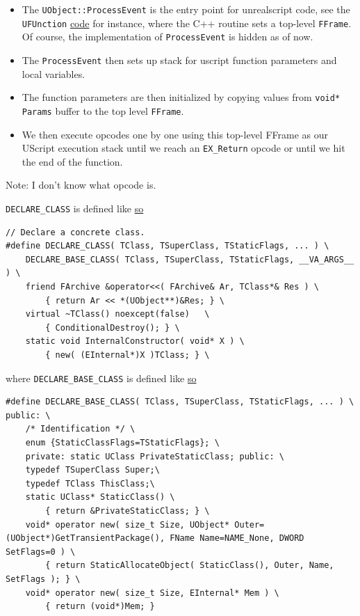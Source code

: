\documentclass{article}
\theoremstyle{definition}
\begin{document}
\begin{itemize}
\item The \texttt{UObject::ProcessEvent} is the entry point for unrealscript code, see the \texttt{UFUnction} \href{https://github.com/ravimohan1991/ChatDiamond/blob/5592fef2b13305e441c1dd2b09dde7dd52ff2d83/UTNativeEssentials/Core/Inc/UnClass.h#L379}{code} for instance, where the C++ routine sets a top-level 
\texttt{FFrame}.  Of course, the implementation of \texttt{ProcessEvent} is hidden as of now.
\item The \texttt{ProcessEvent} then sets up stack for uscript function parameters and local variables.
\item The function parameters are then initialized by copying values from \texttt{void* Params} buffer to the top level
 \texttt{FFrame}.
\item  We then execute opcodes one by one using this top-level FFrame as our UScript execution stack until we reach an \texttt{EX\_Return}
opcode or until we hit the end of the function.
\end{itemize}

Note: I don't know what opcode is.

\texttt{DECLARE\_CLASS} is defined like \href{https://github.com/ravimohan1991/ChatDiamond/blob/5592fef2b13305e441c1dd2b09dde7dd52ff2d83/UTNativeEssentials/Core/Inc/UnObjBas.h#L421}{so}

\lstset{language=C++}
\begin{lstlisting}[frame=single]
// Declare a concrete class.
#define DECLARE_CLASS( TClass, TSuperClass, TStaticFlags, ... ) \
	DECLARE_BASE_CLASS( TClass, TSuperClass, TStaticFlags, __VA_ARGS__ ) \
	friend FArchive &operator<<( FArchive& Ar, TClass*& Res ) \
		{ return Ar << *(UObject**)&Res; } \
	virtual ~TClass() noexcept(false)   \
		{ ConditionalDestroy(); } \
	static void InternalConstructor( void* X ) \
		{ new( (EInternal*)X )TClass; } \
\end{lstlisting}

where \texttt{DECLARE\_BASE\_CLASS} is defined like \href{https://github.com/ravimohan1991/ChatDiamond/blob/5592fef2b13305e441c1dd2b09dde7dd52ff2d83/UTNativeEssentials/Core/Inc/UnObjBas.h#L380}{so}

\lstset{language=C++}
\begin{lstlisting}[frame=single]
#define DECLARE_BASE_CLASS( TClass, TSuperClass, TStaticFlags, ... ) \
public: \
	/* Identification */ \
	enum {StaticClassFlags=TStaticFlags}; \
	private: static UClass PrivateStaticClass; public: \
	typedef TSuperClass Super;\
	typedef TClass ThisClass;\
	static UClass* StaticClass() \
		{ return &PrivateStaticClass; } \
	void* operator new( size_t Size, UObject* Outer=(UObject*)GetTransientPackage(), FName Name=NAME_None, DWORD SetFlags=0 ) \
		{ return StaticAllocateObject( StaticClass(), Outer, Name, SetFlags ); } \
	void* operator new( size_t Size, EInternal* Mem ) \
		{ return (void*)Mem; }
\end{lstlisting}
\end{document}
